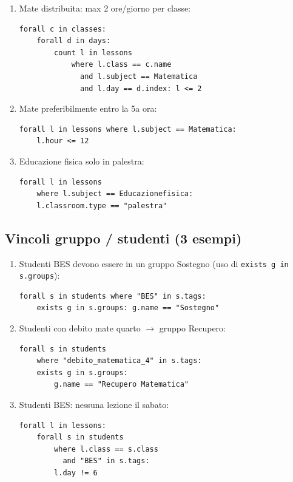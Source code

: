 \begin{enumerate}
\item Mate distribuita: max 2 ore/giorno per classe:
\begin{lstlisting}
forall c in classes:
    forall d in days:
        count l in lessons
            where l.class == c.name
              and l.subject == Matematica
              and l.day == d.index: l <= 2
\end{lstlisting}

\item Mate preferibilmente entro la 5a ora:
\begin{lstlisting}
forall l in lessons where l.subject == Matematica:
    l.hour <= 12
\end{lstlisting}

\item Educazione fisica solo in palestra:
\begin{lstlisting}
forall l in lessons
    where l.subject == Educazionefisica:
    l.classroom.type == "palestra"
\end{lstlisting}
\end{enumerate}

\subsection{Vincoli gruppo / studenti (3 esempi)}

\begin{enumerate}
\item Studenti BES devono essere in un gruppo Sostegno (uso di
\texttt{exists g in s.groups}):
\begin{lstlisting}
forall s in students where "BES" in s.tags:
    exists g in s.groups: g.name == "Sostegno"
\end{lstlisting}

\item Studenti con debito mate quarto $\to$ gruppo Recupero:
\begin{lstlisting}
forall s in students
    where "debito_matematica_4" in s.tags:
    exists g in s.groups:
        g.name == "Recupero Matematica"
\end{lstlisting}

\item Studenti BES: nessuna lezione il sabato:
\begin{lstlisting}
forall l in lessons:
    forall s in students
        where l.class == s.class
          and "BES" in s.tags:
        l.day != 6
\end{lstlisting}
\end{enumerate}

